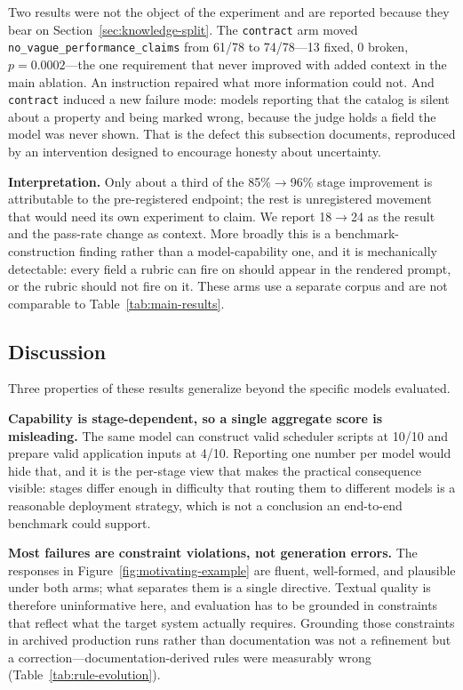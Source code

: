 \documentclass[conference]{IEEEtran}
\begin{document}
Two results were not the object of the experiment and are reported because they bear on Section~\ref{sec:knowledge-split}. The \texttt{contract} arm moved \texttt{no\_vague\_performance\_claims} from 61/78 to 74/78---13 fixed, 0 broken, $p=0.0002$---the one requirement that never improved with added context in the main ablation. An instruction repaired what more information could not. And \texttt{contract} induced a new failure mode: models reporting that the catalog is silent about a property and being marked wrong, because the judge holds a field the model was never shown. That is the defect this subsection documents, reproduced by an intervention designed to encourage honesty about uncertainty.

\textbf{Interpretation.} Only about a third of the 85\%$\to$96\% stage improvement is attributable to the pre-registered endpoint; the rest is unregistered movement that would need its own experiment to claim. We report 18$\to$24 as the result and the pass-rate change as context. More broadly this is a benchmark-construction finding rather than a model-capability one, and it is mechanically detectable: every field a rubric can fire on should appear in the rendered prompt, or the rubric should not fire on it. These arms use a separate corpus and are not comparable to Table~\ref{tab:main-results}.

\subsection{Discussion}
Three properties of these results generalize beyond the specific models evaluated.

\textbf{Capability is stage-dependent, so a single aggregate score is misleading.} The same model can construct valid scheduler scripts at 10/10 and prepare valid application inputs at 4/10. Reporting one number per model would hide that, and it is the per-stage view that makes the practical consequence visible: stages differ enough in difficulty that routing them to different models is a reasonable deployment strategy, which is not a conclusion an end-to-end benchmark could support.

\textbf{Most failures are constraint violations, not generation errors.} The responses in Figure~\ref{fig:motivating-example} are fluent, well-formed, and plausible under both arms; what separates them is a single directive. Textual quality is therefore uninformative here, and evaluation has to be grounded in constraints that reflect what the target system actually requires. Grounding those constraints in archived production runs rather than documentation was not a refinement but a correction---documentation-derived rules were measurably wrong (Table~\ref{tab:rule-evolution}).
\end{document}
